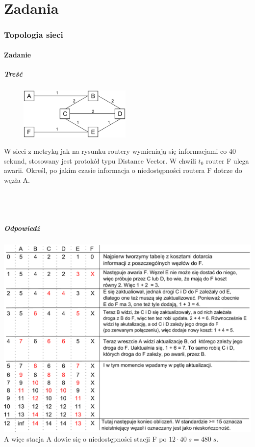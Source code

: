 
\newpage
\part{Zadania}
\section{Topologia sieci}
	\subsection{Zadanie}
		\subsubsection{Treść}
			\begin{figure}
				\includegraphics[width=5.5cm]{./images/zadanie02.pdf}
			\end{figure} 
			W sieci z metryką jak na rysunku routery wymieniają się informacjami co 40 sekund, stosowany jest protokół typu Distance Vector. W chwili $ t_0 $ router F ulega awarii. Określ, po jakim czasie informacja o niedostępności routera F dotrze do węzła A.\\\\\\\\
		\subsubsection{Odpowiedź}
			\includegraphics[width=16.0cm]{./images/zadanie03.pdf}\\
			A więc stacja A dowie się o niedostępności stacji F po $ 12\cdot 40\;s=480\;s $.
\newpage
